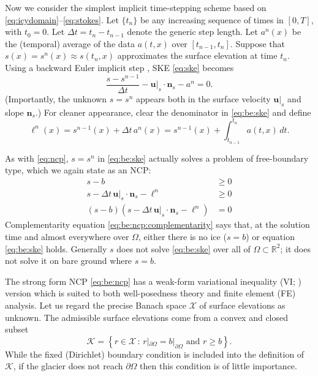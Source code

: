 \documentclass[hidelinks,onefignum,onetabnum,final]{siamart220329}  %
\newcommand{\RR}{\mathbb{R}}
\newcommand{\bn}{\mathbf{n}}
\newcommand{\bu}{\mathbf{u}}
\newcommand{\cK}{\mathcal{K}}
\newcommand{\cX}{\mathcal{X}}
\begin{document}
Now we consider the simplest implicit time-stepping scheme based on \eqref{eq:icydomain}--\eqref{eq:stokes}.  Let $\{t_n\}$ be any increasing sequence of times in $[0,T]$, with $t_0=0$.  Let $\Delta t = t_n-t_{n-1}$ denote the generic step length.  Let $a^n(x)$ be the (temporal) average of the data $a(t,x)$ over $[t_{n-1},t_n]$.  Suppose that $s(x)=s^n(x)\approx s(t_n,x)$ approximates the surface elevation at time $t_n$.  Using a backward Euler implicit step \cite{AscherPetzold1998}, SKE \eqref{eq:ske} becomes
\begin{equation}
\frac{s - s^{n-1}}{\Delta t} - \bu|_{s} \cdot \bn_{s} - a^n = 0. \label{eq:be:ske}
\end{equation}
(Importantly, the unknown $s=s^n$ appears both in the surface velocity $\bu|_s$ and slope $\bn_s$.)  For cleaner appearance, clear the denominator in \eqref{eq:be:ske} and define
\begin{equation}
\ell^n(x) = s^{n-1}(x)+\Delta t\,a^n(x) = s^{n-1}(x) + \int_{t_{n-1}}^{t_n} a(t,x)\,dt. \label{eq:be:source}
\end{equation}

As with \eqref{eq:ncp}, $s=s^n$ in \eqref{eq:be:ske} actually solves a problem of free-boundary type, which we again state as an NCP:
\begin{subequations}
\label{eq:be:ncp}
\begin{align}
s - b &\ge 0 \label{eq:be:ncp:constraint} \\
s - \Delta t\,\bu|_s \cdot \bn_s - \ell^n &\ge 0 \label{eq:be:ncp:residualpos} \\
(s - b) \left(s - \Delta t\,\bu|_s \cdot \bn_s - \ell^n\right) &= 0 \label{eq:be:ncp:complementarity}
\end{align}
\end{subequations}
Complementarity equation \eqref{eq:be:ncp:complementarity} says that, at the solution time and almost everywhere over $\Omega$, either there is no ice ($s=b$) or equation \eqref{eq:be:ske} holds.  Generally $s$ does not solve \eqref{eq:be:ske} over all of $\Omega \subset \RR^2$; it does not solve it on bare ground where $s=b$.

The strong form NCP \eqref{eq:be:ncp} has a weak-form variational inequality (VI; \cite{Evans2010,KinderlehrerStampacchia1980}) version which is suited to both well-posedness theory and finite element (FE) analysis.  Let us regard the precise Banach space $\cX$ of surface elevations as unknown.  The admissible surface elevations come from a convex and closed subset
\begin{equation}
\cK = \left\{r \in\cX\,:\,r|_{\partial\Omega}=b|_{\partial\Omega} \text{ and } r \ge b\right\}.  \label{eq:be:admissible}
\end{equation}
While the fixed (Dirichlet) boundary condition is included into the definition of $\cK$, if the glacier does not reach $\partial\Omega$ then this condition is of little importance.
\end{document}
